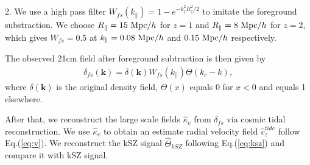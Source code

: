 2. We use a high pass filter $W_{fs}(k_\parallel)=1-e^{-k_\parallel^2R_\parallel^2/2}$ to imitate the foreground substraction. 
We choose 
$R_\parallel=15\ \mathrm{Mpc}/h$ for $z=1$ and $R_\parallel=8\ \mathrm{Mpc}/h$ for $z=2$, which gives
$W_{fs}=0.5$ at
$k_\parallel=0.08\ \mathrm{Mpc}/h$ and $0.15\ \mathrm{Mpc}/h$ respectively. 

The observed 21cm field after foreground subtraction is then given by 
\begin{eqnarray}
\label{eq:fs}
\delta_{fs}(\bm{k})=\delta(\bm{k})W_{fs}(k_\parallel)\Theta(k_c-k),
\end{eqnarray}
where $\delta(\bm{k})$ is the original density field, 
$\Theta(x)$ equals 0 for $x<0$ and equals 1 elsewhere.

After that, we reconstruct the large scale fields $\hat \kappa_c$ from $\delta_{fs}$ via
cosmic tidal reconstruction. 
We use $\hat \kappa_c$ to obtain an estimate radial velocity field $\hat v_z^{tide}$ follow Eq.(\ref{eq:v}).
We reconstruct the kSZ signal $\hat \Theta_{kSZ}$ following Eq.(\ref{eq:ksz}) and compare it with kSZ signal.

